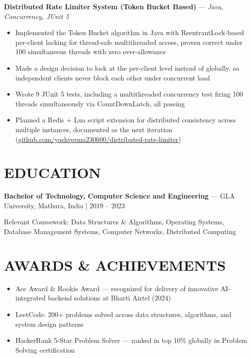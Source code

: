 \documentclass[10.5pt,a4paper]{article}
\newcommand{\proj}[2]{\vspace{4pt}\textbf{#1} \hspace{0.3em}---\hspace{0.3em} \textit{#2}\par\vspace{-1pt}}
\newenvironment{bul}{\begin{itemize}[leftmargin=2.2em,itemsep=2pt,topsep=2pt,parsep=0pt,label=\textbullet]}{\end{itemize}}
\begin{document}
\proj{Distributed Rate Limiter System (Token Bucket Based)}{Java, Concurrency, JUnit 5}
\begin{bul}
\item Implemented the Token Bucket algorithm in Java with ReentrantLock-based per-client locking for thread-safe multithreaded access, proven correct under 100 simultaneous threads with zero over-allowance
\item Made a design decision to lock at the per-client level instead of globally, so independent clients never block each other under concurrent load
\item Wrote 9 JUnit 5 tests, including a multithreaded concurrency test firing 100 threads simultaneously via CountDownLatch, all passing
\item Planned a Redis + Lua script extension for distributed consistency across multiple instances, documented as the next iteration (\href{https://github.com/yashverma230600/distributed-rate-limiter}{github.com/yashverma230600/distributed-rate-limiter})
\end{bul}

\section{EDUCATION}
\textbf{Bachelor of Technology, Computer Science and Engineering} \hspace{0.3em}---\hspace{0.3em} GLA University, Mathura, India \hfill {\color{greytxt}\small | 2019 -- 2023}\par\vspace{2pt}
Relevant Coursework: Data Structures \& Algorithms, Operating Systems, Database Management Systems, Computer Networks, Distributed Computing

\section{AWARDS \& ACHIEVEMENTS}
\begin{bul}
\item Ace Award \& Rookie Award --- recognized for delivery of innovative AI-integrated backend solutions at Bharti Airtel (2024)
\item LeetCode: 200+ problems solved across data structures, algorithms, and system design patterns
\item HackerRank 5-Star Problem Solver --- ranked in top 10\% globally in Problem Solving certification
\end{bul}
\end{document}
